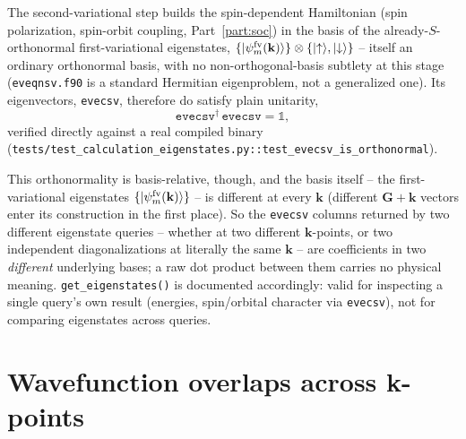 \documentclass[11pt]{article}
\begin{document}
The second-variational step builds the spin-dependent Hamiltonian (spin polarization,
spin-orbit coupling, Part~\ref{part:soc}) in the basis of the already-$S$-orthonormal
first-variational eigenstates, $\{|\psi_m^{\rm fv}(\mathbf k)\rangle\}\otimes\{|{\uparrow}
\rangle,|{\downarrow}\rangle\}$ -- itself an ordinary orthonormal basis, with no
non-orthogonal-basis subtlety at this stage (\texttt{eveqnsv.f90} is a standard Hermitian
eigenproblem, not a generalized one). Its eigenvectors, \texttt{evecsv}, therefore do satisfy
plain unitarity,
\begin{equation}
  \texttt{evecsv}^\dagger\,\texttt{evecsv} = \mathbb{1},
  \label{eq:evecsv-unitary}
\end{equation}
verified directly against a real compiled binary
(\texttt{tests/test\_calculation\_eigenstates.py::test\_evecsv\_is\_orthonormal}).

This orthonormality is basis-relative, though, and the basis itself -- the first-variational
eigenstates $\{|\psi_m^{\rm fv}(\mathbf k)\rangle\}$ -- is different at every $\mathbf k$
(different $\mathbf G+\mathbf k$ vectors enter its construction in the first place). So the
\texttt{evecsv} columns returned by two different eigenstate queries -- whether at two
different $\mathbf k$-points, or two independent diagonalizations at literally the same
$\mathbf k$ -- are coefficients in two \emph{different} underlying bases; a raw dot product
between them carries no physical meaning. \texttt{get\_eigenstates()} is documented
accordingly: valid for inspecting a single query's own result (energies, spin/orbital
character via \texttt{evecsv}), not for comparing eigenstates across queries.

\section{Wavefunction overlaps across k-points}
\end{document}
